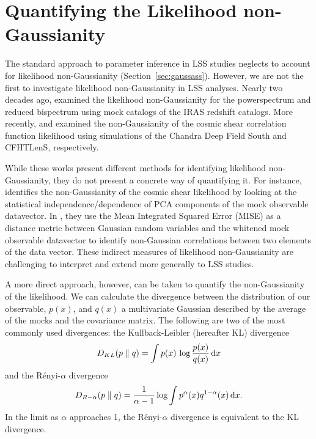 \documentclass[12pt, letterpaper, preprint]{aastex}
\newcommand{\beq}{\begin{equation}}
\newcommand{\eeq}{\end{equation}}
\begin{document}
\section{Quantifying the Likelihood non-Gaussianity} \label{sec:div}
The standard approach to parameter inference in LSS studies neglects
to account for likelihood non-Gaussianity (Section~\ref{sec:gaussass}). 
However, we are not the first to investigate likelihood non-Gaussianity 
in LSS analyses. Nearly two decades ago, \cite{scoccimarro2000} examined 
the likelihood non-Gaussianity for the powerspectrum and reduced bispectrum 
using mock catalogs of the IRAS redshift catalogs. More recently, 
\cite{hartlap2009} and \cite{sellentin2017} examined the non-Gaussianity 
of the cosmic shear correlation function likelihood using simulations of 
the Chandra Deep Field South and CFHTLenS, respectively. 

While these works present different methods for identifying 
likelihood non-Gaussianity, they do not present a concrete way of 
quantifying it. For instance, \cite{hartlap2009} identifies the
non-Gaussianity of the cosmic shear likelihood by looking at the
statistical independence/dependence of PCA components of the mock 
observable datavector. In \cite{sellentin2017}, they use the Mean
Integrated Squared Error (MISE) as a distance metric between 
Gaussian random variables and the whitened mock observable 
datavector to identify non-Gaussian correlations between two elements 
of the data vector. These indirect measures of likelihood non-Gaussianity 
are challenging to interpret and extend more generally to LSS studies. 


A more direct approach, however, can be taken to quantify the 
non-Gaussianity of the likelihood. We can calculate the divergence between 
the distribution of our observable, $p(x)$, and $q(x)$ a multivariate Gaussian described 
by the average of the mocks and the covariance matrix.
The following are two of the most commonly used divergences: 
the Kullback-Leibler (hereafter KL) divergence
\beq \label{eq:kl} 
D_{KL} ( p \parallel q ) = \int p(x)\,\log \frac{p(x)}{q(x)}\,{\rm d}x
\eeq
and the R\'enyi-$\alpha$ divergence
\beq \label{eq:renyi}
D_{R-\alpha} ( p \parallel q ) = \frac{1}{\alpha -1} \log \int p^\alpha(x) q^{1 -\alpha}(x)\,{\rm d}x. 
\eeq
In the limit as $\alpha$ approaches 1, the R\'enyi-$\alpha$ divergence is
equivalent to the KL divergence.
\end{document}
